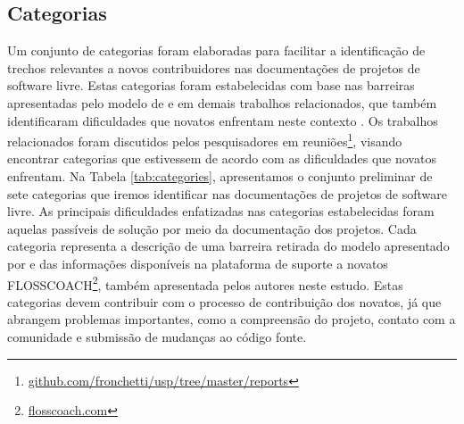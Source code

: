\subsection{Categorias}
\label{sec:categorias}
Um conjunto de categorias foram elaboradas para facilitar a identificação de trechos relevantes a novos contribuidores nas documentações de projetos de software livre. Estas categorias foram estabelecidas com base nas barreiras apresentadas pelo modelo de \citet{steinmacher2016overcoming} e em demais trabalhos relacionados, que também identificaram dificuldades que novatos enfrentam neste contexto \citep{von2003community, hannebauer2017relationship}. Os trabalhos relacionados foram discutidos pelos pesquisadores em reuniões\footnote{\url{github.com/fronchetti/usp/tree/master/reports}}, visando encontrar categorias que estivessem de acordo com as dificuldades que novatos enfrentam. Na Tabela \ref{tab:categories}, apresentamos o conjunto preliminar de sete categorias que iremos identificar nas documentações de projetos de software livre. As principais dificuldades enfatizadas nas categorias estabelecidas foram aquelas passíveis de solução por meio da documentação dos projetos. Cada categoria representa a descrição de uma barreira retirada do modelo apresentado por \citet{steinmacher2016overcoming} e das informações disponíveis na plataforma de suporte a novatos FLOSSCOACH\footnote{\url{flosscoach.com}}, também apresentada pelos autores neste estudo. Estas categorias devem contribuir com o processo de contribuição dos novatos, já que abrangem problemas importantes, como a compreensão do projeto, contato com a comunidade e submissão de mudanças ao código fonte.

